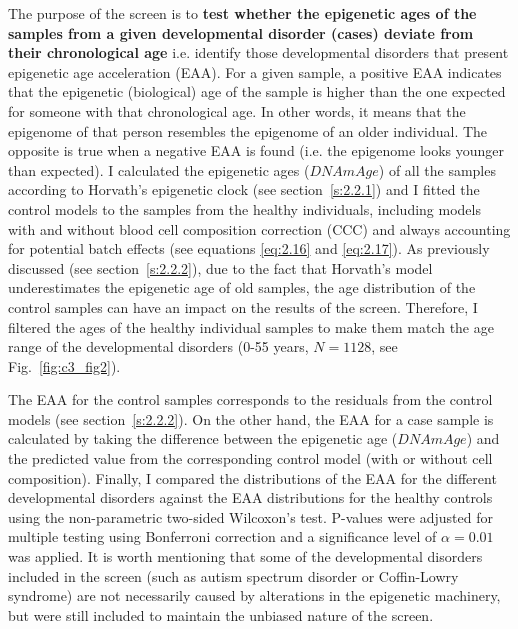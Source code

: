 \bigskip

The purpose of the screen is to \textbf{test whether the epigenetic ages of the samples from a given developmental disorder (cases) deviate from their chronological age} i.e. identify those developmental disorders that present epigenetic age acceleration (EAA). For a given sample, a positive EAA indicates that the epigenetic (biological) age of the sample is higher than the one expected for someone with that chronological age. In other words, it means that the epigenome of that person resembles the epigenome of an older individual. The opposite is true when a negative EAA is found (i.e. the epigenome looks younger than expected). I calculated the epigenetic ages ($DNAmAge$) of all the samples according to Horvath's epigenetic clock (see section~\ref{s:2.2.1}) and I fitted the control models to the samples from the healthy individuals, including models with and without blood cell composition correction (CCC) and always accounting for potential batch effects (see equations \ref{eq:2.16} and \ref{eq:2.17}).  As previously discussed (see section~\ref{s:2.2.2}), due to the fact that Horvath's model underestimates the epigenetic age of old samples, the age distribution of the control samples can have an impact on the results of the screen. Therefore, I filtered the ages of the healthy individual samples to make them match the age range of the developmental disorders (0-55 years, $N = 1128$, see Fig.~\ref{fig:c3_fig2}).

\bigskip

The EAA for the control samples corresponds to the residuals from the control models (see section~\ref{s:2.2.2}). On the other hand, the EAA for a case sample is calculated by taking the difference between the epigenetic age ($DNAmAge$) and the predicted value from the corresponding control model (with or without cell composition). Finally, I compared the distributions of the EAA for the different developmental disorders against the EAA distributions for the healthy controls using the non-parametric two-sided Wilcoxon's test. P-values were adjusted for multiple testing using Bonferroni correction and a significance level of $\alpha = 0.01$ was applied. It is worth mentioning that some of the developmental disorders included in the screen (such as autism spectrum disorder or Coffin-Lowry syndrome) are not necessarily caused by alterations in the epigenetic machinery, but were still included to maintain the unbiased nature of the screen. 

\smallskip

